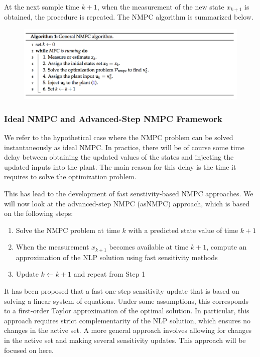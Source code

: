\documentclass{article}
\theoremstyle{example}
\theoremstyle{definition}
\theoremstyle{assumption}
\theoremstyle{lemma}
\begin{document}
At the next sample time $k+1$, when the measurement of the new state $x_{k+1}$ is obtained, the procedure is repeated.
The NMPC algorithm is summarized below.
\begin{figure}[H]
	\centering
	\includegraphics{NMPC_algo}
\end{figure}
\subsubsection{Ideal NMPC and Advanced-Step NMPC Framework}
	We refer to the hypothetical case where the NMPC problem can be solved instantaneously as ideal NMPC.
	In practice, there will be of course some time delay between obtaining the updated values of the states and injecting the updated inputs into the plant.
	The main reason for this delay is the time it requires to solve the optimization problem.
	\par
	This has lead to the development of fast senstivity-based NMPC approaches.
	We will now look at the advanced-step NMPC (asNMPC) approach, which is based on the following steps:
	\begin{enumerate}[label=(\alph*)]
		\item Solve the NMPC problem at time $k$ with a predicted state value of time $k+1$ 
		\item When the measurement $x_{k+1}$ becomes available at time $k+1$, compute an approximation of the NLP solution using fast sensitivity methods
		\item Update $k\leftarrow k+1$ and repeat from Step 1
	\end{enumerate}
	\par
	It has been proposed that a fast one-step sensitivity update that is based on solving a linear system of equations.
	Under some assumptions, this corresponds to a first-order Taylor approximation of the optimal solution.
	In particular, this approach requires strict complementarity of the NLP solution, which ensures no changes in the active set.
	A more general approach involves allowing for changes in the active set and making several sensitivity updates.
	This approach will be focused on here.
\end{document}

